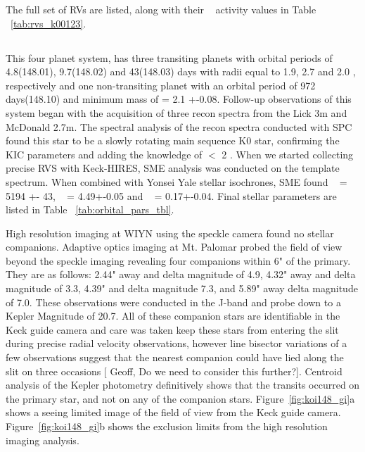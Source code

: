 \documentclass{emulateapj}
\begin{document}
The full set of RVs are listed, along with their \rphk~ activity values in Table ~\ref{tab:rvs_k00123}.


\subsection{\koionefoureight} %

This  four planet system, has three transiting planets with orbital periods of 4.8(148.01), 9.7(148.02) and 43(148.03) days with radii equal to 1.9, 2.7 and 2.0 \rearth, respectively and one non-transiting planet with an orbital  period of  972 days(148.10) and minimum mass of \msini = 2.1 +-0.08\mjupe. Follow-up observations of this system began with the acquisition of three recon spectra from the Lick 3m and McDonald 2.7m. The spectral analysis of the recon spectra conducted with SPC found this star to be a slowly rotating main sequence K0 star, confirming the KIC parameters and adding the knowledge of \vsini $<$ 2 \kms. When we started collecting precise RVS  with Keck-HIRES, SME analysis was conducted on the template spectrum. When combined with Yonsei Yale stellar isochrones, SME found \teff~ = 5194 +- 43, \logg~ = 4.49+-0.05 and \feh~ = 0.17+-0.04. Final stellar parameters are  listed in Table ~\ref{tab:orbital_pars_tbl}. 

High resolution imaging at WIYN using the speckle camera found no stellar companions. Adaptive optics imaging at Mt. Palomar probed the field of view beyond the speckle imaging revealing four companions within 6" of the primary. They are as follows: 2.44" away and delta magnitude of 4.9,  4.32" away and delta magnitude of 3.3, 4.39" and delta magnitude 7.3, and 5.89" away delta magnitude of 7.0. These observations were conducted in the J-band and probe down to a Kepler Magnitude of 20.7\citep{Adams2012}.  All of these companion stars are identifiable in the Keck guide camera and care was taken keep these stars from entering the slit during precise radial velocity observations, however line bisector variations of a few observations suggest that the nearest companion could have lied along the slit on three occasions [ Geoff, Do we need to consider this further?]. Centroid analysis of the Kepler photometry definitively shows that the transits occurred on the primary star, and not on any of the companion stars. Figure~\ref{fig:koi148_gi}a shows a seeing limited image of the field of view from the Keck guide camera. Figure~\ref{fig:koi148_gi}b shows the exclusion limits from the high resolution imaging analysis.
\end{document}

